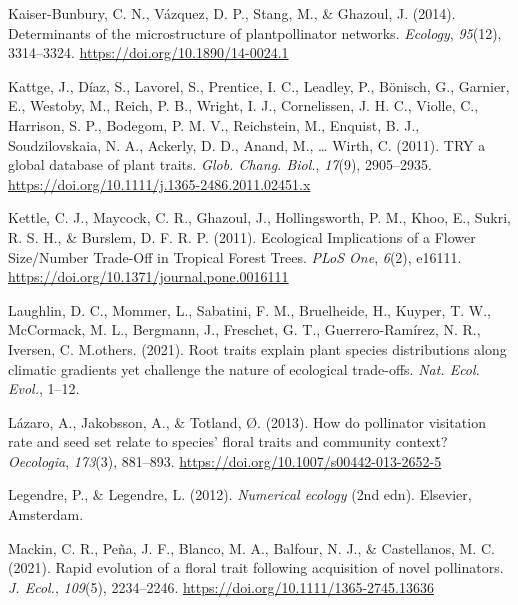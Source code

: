 \documentclass[
  12pt,
  a4paper,
]{article}
\newlength{\cslhangindent}
\newlength{\cslentryspacingunit} %
\newenvironment{CSLReferences}[2] %
 {%
  \setlength{\parindent}{0pt}
  \ifodd #1
  \let\oldpar\par
  \def\par{\hangindent=\cslhangindent\oldpar}
  \fi
  \setlength{\parskip}{#2\cslentryspacingunit}
 }%
 {}
\begin{document}
\begin{CSLReferences}{1}{0}
\leavevmode{}%
Kaiser-Bunbury, C. N., Vázquez, D. P., Stang, M., \& Ghazoul, J. (2014). Determinants of the microstructure of plant\textendash pollinator networks. \emph{Ecology}, \emph{95}(12), 3314--3324. \url{https://doi.org/10.1890/14-0024.1}

\leavevmode{}%
Kattge, J., Díaz, S., Lavorel, S., Prentice, I. C., Leadley, P., Bönisch, G., Garnier, E., Westoby, M., Reich, P. B., Wright, I. J., Cornelissen, J. H. C., Violle, C., Harrison, S. P., Bodegom, P. M. V., Reichstein, M., Enquist, B. J., Soudzilovskaia, N. A., Ackerly, D. D., Anand, M., \ldots{} Wirth, C. (2011). {TRY} \textendash{} a global database of plant traits. \emph{Glob. Chang. Biol.}, \emph{17}(9), 2905--2935. \url{https://doi.org/10.1111/j.1365-2486.2011.02451.x}

\leavevmode{}%
Kettle, C. J., Maycock, C. R., Ghazoul, J., Hollingsworth, P. M., Khoo, E., Sukri, R. S. H., \& Burslem, D. F. R. P. (2011). Ecological {Implications} of a {Flower Size}/{Number Trade}-{Off} in {Tropical Forest Trees}. \emph{PLoS One}, \emph{6}(2), e16111. \url{https://doi.org/10.1371/journal.pone.0016111}

\leavevmode{}%
Laughlin, D. C., Mommer, L., Sabatini, F. M., Bruelheide, H., Kuyper, T. W., McCormack, M. L., Bergmann, J., Freschet, G. T., Guerrero-Ramírez, N. R., Iversen, C. M.others. (2021). Root traits explain plant species distributions along climatic gradients yet challenge the nature of ecological trade-offs. \emph{Nat. Ecol. Evol.}, 1--12.

\leavevmode{}%
Lázaro, A., Jakobsson, A., \& Totland, Ø. (2013). How do pollinator visitation rate and seed set relate to species' floral traits and community context? \emph{Oecologia}, \emph{173}(3), 881--893. \url{https://doi.org/10.1007/s00442-013-2652-5}

\leavevmode{}%
Legendre, P., \& Legendre, L. (2012). \emph{Numerical ecology} ({2nd edn}). {Elsevier, Amsterdam}.

\leavevmode{}%
Mackin, C. R., Peña, J. F., Blanco, M. A., Balfour, N. J., \& Castellanos, M. C. (2021). Rapid evolution of a floral trait following acquisition of novel pollinators. \emph{J. Ecol.}, \emph{109}(5), 2234--2246. \url{https://doi.org/10.1111/1365-2745.13636}


\end{CSLReferences}
\end{document}
